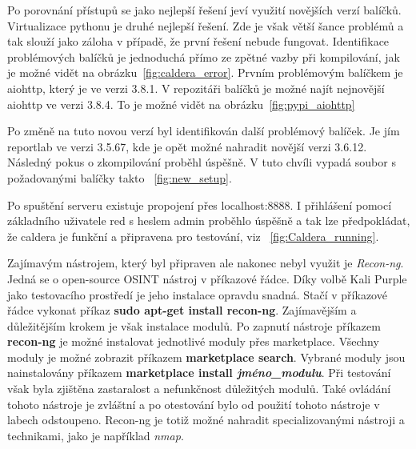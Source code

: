 Po porovnání přístupů se jako nejlepší řešení jeví využití novějších verzí balíčků.
Virtualizace pythonu je druhé nejlepší řešení.
Zde je však větší šance problémů a tak slouží jako záloha v případě, že první řešení nebude fungovat.
Identifikace problémových balíčků je jednoduchá přímo ze zpětné vazby při kompilování, jak je možné vidět na obrázku~\ref{fig:caldera_error}.
Prvním problémovým balíčkem je aiohttp, který je ve verzi 3.8.1.
V repozitáři balíčků je možné najít nejnovější aiohttp ve verzi 3.8.4.
To je možné vidět na obrázku~\ref{fig:pypi_aiohttp}

Po změně na tuto novou verzí byl identifikován další problémový balíček.
Je jím reportlab ve verzi 3.5.67, kde je opět možné nahradit novější verzi 3.6.12.
Následný pokus o zkompilování proběhl úspěšně.
V tuto chvíli vypadá soubor s požadovanými balíčky takto ~\ref{fig:new_setup}.

Po spuštění serveru existuje propojení přes localhost:8888.
I přihlášení pomocí základního uživatele red s heslem admin proběhlo úspěšně a tak lze předpokládat, že caldera je funkční a připravena pro testování, viz ~\ref{fig:Caldera_running}.

Zajímavým nástrojem, který byl připraven ale nakonec nebyl využit je \textit{Recon-ng}.
Jedná se o open-source \ac{OSINT} nástroj v příkazové řádce.
Díky volbě Kali Purple jako testovacího prostředí je jeho instalace opravdu snadná.
Stačí v příkazové řádce vykonat příkaz \textbf{sudo apt-get install recon-ng}.
Zajímavějším a důležitějším krokem je však instalace modulů.
Po zapnutí nástroje příkazem \textbf{recon-ng} je možné instalovat jednotlivé moduly přes marketplace.
Všechny moduly je možné zobrazit příkazem \textbf{marketplace search}.
Vybrané moduly jsou nainstalovány příkazem \textbf{marketplace install \textit{jméno\_modulu}}.
Při testování však byla zjištěna zastaralost a nefunkčnost důležitých modulů.
Také ovládání tohoto nástroje je zvláštní a po otestování bylo od použití tohoto nástroje v labech odstoupeno.
Recon-ng je totiž možné nahradit specializovanými nástroji a technikami, jako je například \textit{nmap}.


